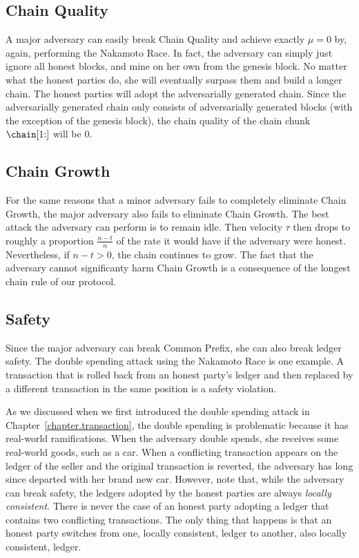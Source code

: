 \subsection*{Chain Quality}
A major adversary can easily break Chain Quality and achieve exactly $\mu = 0$ by, again,
performing the Nakamoto Race. In fact, the adversary can simply just ignore all honest blocks,
and mine on her own from the genesis block. No matter what the honest parties do, she will eventually
surpass them and build a longer chain. The honest parties will adopt the adversarially generated
chain. Since the adversarially generated chain only consists of adversarially generated blocks
(with the exception of the genesis block), the chain quality of the chain chunk $\chain[1{:}]$
will be $0$.

\subsection*{Chain Growth}
For the same reasons that a minor adversary fails to completely eliminate Chain Growth, the
major adversary also fails to eliminate Chain Growth. The best attack the adversary can perform
is to remain idle. Then velocity $\tau$ then drops to roughly a proportion $\frac{n - t}{n}$ of the rate
it would have if the adversary were honest. Nevertheless, if $n - t > 0$, the chain continues
to grow. The fact that the adversary cannot significanty harm Chain Growth is a consequence of
the longest chain rule of our protocol.

\subsection*{Safety}
Since the major adversary can break Common Prefix, she can also break ledger safety. The double
spending attack using the Nakamoto Race is one example. A transaction that is rolled back from
an honest party's ledger and then replaced by a different transaction in the same position
is a safety violation.

As we discussed when we first introduced the double spending attack in Chapter~\ref{chapter.transaction},
the double spending is problematic because it has real-world ramifications. When the adversary double
spends, she receives some real-world goods, such as a car. When a conflicting transaction appears on
the ledger of the seller and the original transaction is reverted, the adversary has long since
departed with her brand new car. However, note that, while the adversary can break safety, the
ledgers adopted by the honest parties are always \emph{locally consistent}. There is never the
case of an honest party adopting a ledger that contains two conflicting transactions. The only
thing that happens is that an honest party switches from one, locally consistent, ledger to another,
also locally consistent, ledger.

